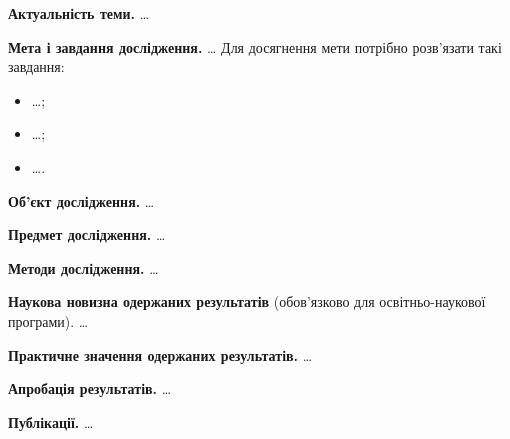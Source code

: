 
\textbf{Актуальність теми.} \dots

\textbf{Мета і завдання дослідження.} \dots
Для досягнення мети потрібно розв'язати такі завдання:
\begin{itemize}
  \item \dots;
  \item \dots;
  \item \dots.
\end{itemize}

\textbf{Об'єкт дослідження.} \dots

\textbf{Предмет дослідження.} \dots

\textbf{Методи дослідження.} \dots

\textbf{Наукова новизна одержаних результатів} (обов'язково для
освітньо-наукової програми). \dots

\textbf{Практичне значення одержаних результатів.} \dots

\textbf{Апробація результатів.} \dots

\textbf{Публікації.} \dots
